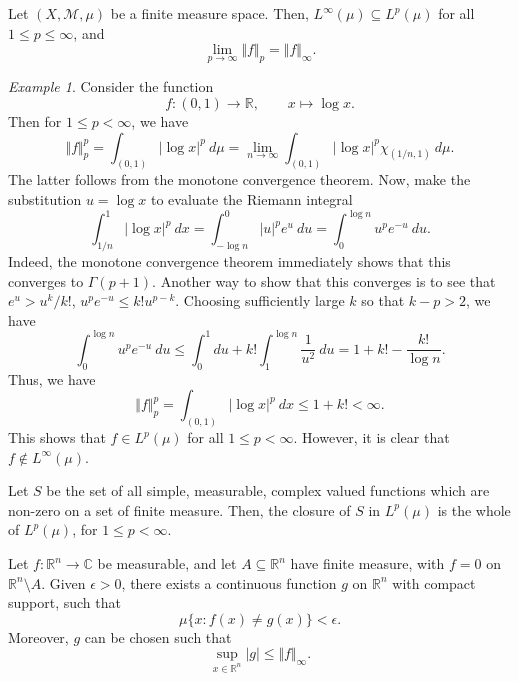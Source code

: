 \documentclass[11pt]{article}
\newcommand{\C}{\mathbb{C}}
\newcommand{\R}{\mathbb{R}}
\newcommand{\M}{\mathcal{M}}
\newcommand{\norm}[1]{\Vert #1 \Vert}
\theoremstyle{definition}
\theoremstyle{remark}
\newtheorem*{example}{Example}
\numberwithin{equation}{section}
\begin{document}
    \begin{theorem}
        Let $(X, \M, \mu)$ be a finite measure space. Then, $L^\infty(\mu) \subseteq
        L^p(\mu)$ for all $1 \leq p \leq \infty$, and \[
            \lim_{p \to \infty} \norm{f}_p = \norm{f}_\infty.
        \] 
    \end{theorem}
    \begin{example}
        Consider the function \[
            f\colon (0, 1) \to \R, \qquad x \mapsto \log{x}.
        \] Then for $1 \leq p < \infty$, we have \[
            \norm{f}_p^p = \int_{(0, 1)} |\log{x}|^p\:d\mu = \lim_{n \to \infty}
            \int_{(0, 1)} |\log{x}|^p\chi_{(1/n, 1)}\:d\mu.
        \] The latter follows from the monotone convergence theorem. Now, make the
        substitution $u = \log{x}$ to evaluate the Riemann integral \[
            \int_{1 / n}^1 |\log{x}|^p\:dx = \int_{-\log{n}}^0 |u|^p e^{u}\:du 
            = \int_0^{\log{n}} u^p e^{-u}\:du.
        \] Indeed, the monotone convergence theorem immediately shows that this
        converges to $\Gamma(p + 1)$. Another way to show that this converges is to
        see that $e^u > u^k / k!$, $u^pe^{-u} \leq k!u^{p - k}$. Choosing
        sufficiently large $k$ so that $k - p > 2$, we have \[
            \int_0^{\log{n}} u^p e^{-u}\:du \leq \int_0^1 du + k!\int_1^{\log{n}}
            \frac{1}{u^2}\:du = 1 + k! - \frac{k!}{\log{n}}.
        \] Thus, we have \[
            \norm{f}_p^p = \int_{(0, 1)}|\log{x}|^p\:dx \leq 1 + k! < \infty.
        \] This shows that $f \in L^p(\mu)$ for all $1 \leq p < \infty$. However, it
        is clear that $f \notin L^\infty(\mu)$.
    \end{example}

    \begin{theorem}
        Let $S$ be the set of all simple, measurable, complex valued functions which
        are non-zero on a set of finite measure. Then, the closure of $S$ in
        $L^p(\mu)$ is the whole of $L^p(\mu)$, for $1 \leq p < \infty$.
    \end{theorem}
    
    \begin{theorem}[Lusin]
        Let $f\colon \R^n \to \C$ be measurable, and let $A\subseteq \R^n$ have
        finite measure, with $f = 0$ on $\R^n \setminus A$. Given $\epsilon > 0$,
        there exists a continuous function $g$ on $\R^n$ with compact support, such
        that \[
            \mu\{x: f(x) \neq g(x)\} < \epsilon.
        \] Moreover, $g$ can be chosen such that \[
            \sup_{x \in \R^n} |g| \leq \norm{f}_\infty.
        \] 
    \end{theorem}
\end{document}
